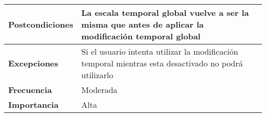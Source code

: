 \begin{longtable}{l|l}
\begin{minipage}{0.25\columnwidth}
\textbf{Postcondiciones} 
\end{minipage}
&
\begin{minipage}{0.65\columnwidth}
La escala temporal global vuelve a ser la misma que antes de aplicar la modificación temporal global
\end{minipage}
\\ \hline

\begin{minipage}{0.25\columnwidth}
\textbf{Excepciones} 
\end{minipage}
&
\begin{minipage}{0.65\columnwidth}
Si el usuario intenta utilizar la modificación temporal mientras esta desactivado no podrá utilizarlo 
\end{minipage}
\\ \hline

\begin{minipage}{0.25\columnwidth}
\textbf{Frecuencia} 
\end{minipage}
&
\begin{minipage}{0.65\columnwidth}
Moderada
\end{minipage}
\\ \hline

\begin{minipage}{0.25\columnwidth}
\textbf{Importancia} 
\end{minipage}
&
\begin{minipage}{0.65\columnwidth}
Alta
\end{minipage}
\\ \hline
\end{longtable}
